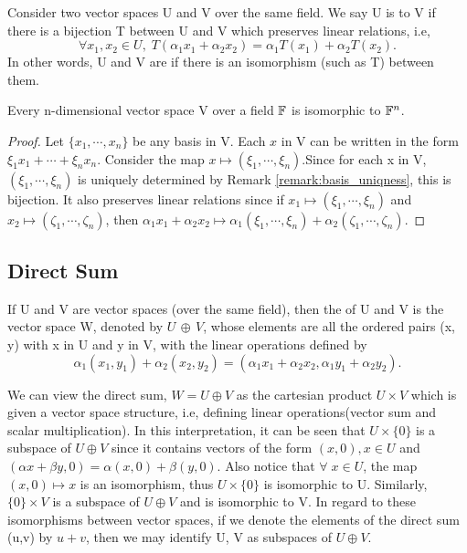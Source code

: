\documentclass[10pt,a4paper]{article}
\begin{document}
\begin{mydef}\label{def:isomorphism}
    Consider two vector spaces U and V over the same field. We say U is  to V if there is a bijection T between U and V which preserves linear relations, i.e, 
    $$\forall x_1,x_2\in U,\;T(\alpha_1 x_1+\alpha_2 x_2) = \alpha_1 T(x_1)+\alpha_2 T(x_2).
    $$
    In other words, U and V are  if there is an isomorphism (such as T) between them.
\end{mydef}

\begin{theorem}\label{thm:F^n_isomorphism}
    Every n-dimensional vector space V over a field $\mathbb{F}$ is isomorphic to $\mathbb{F}^n$.
\end{theorem}

\begin{proof}
    Let $\{x_1,\cdots, x_n\}$ be any basis in V. Each $x$ in V can be written in the form $\xi_1x_1 + \cdots + \xi_nx_n$. Consider the map $x \mapsto (\xi_1,\cdots,\xi_n)$.Since for each x in V, $(\xi_1,\cdots,\xi_n)$ is uniquely determined by Remark \ref{remark:basis_uniqness}, this is bijection. It also preserves linear relations since if $x_1\mapsto (\xi_1,\cdots,\xi_n)$ and $x_2\mapsto (\zeta_1,\cdots,\zeta_n)$, then
    $
        \alpha_1 x_1+\alpha_2 x_2 \mapsto \alpha_1(\xi_1,\cdots,\xi_n)+\alpha_2(\zeta_1,\cdots,\zeta_n).
    $
\end{proof}


\subsection{Direct Sum}\label{sec:direct_sum}

\begin{mydef}\label{def:direct_sum}
    If U and V are vector spaces (over the same field), then the  of U and V is the vector space W, denoted by $U\,\oplus\, V$, whose elements are all the ordered pairs (x, y) with x in U and y in V, with the linear operations defined by
    $$
    \alpha_1(x_1, y_1) + \alpha_2(x_2, y_2) = (\alpha_1x_1+\alpha_2x_2,\alpha_1y_1+\alpha_2y_2).
    $$
\end{mydef}

\begin{note}\label{note:direct_sum}
    We can view the direct sum, $W = U\oplus V$ as the cartesian product $U\times V$ which is given a vector space structure, i.e, defining linear operations(vector sum and scalar multiplication). In this interpretation, it can be seen that $U\times\{0\}$ is a subspace of $U\oplus V$ since it contains vectors of the form $(x,0),x\in U$ and $(\alpha x+\beta y,0) = \alpha(x,0)+\beta(y,0).$ Also notice that $\forall\;x\in U$, the map $(x,0)\mapsto x$ is an isomorphism, thus $U\times\{0\}$ is isomorphic to U. Similarly, $\{0\}\times V$ is a subspace of $U\oplus V$ and is isomorphic to V. In regard to these isomorphisms between vector spaces, if we denote the elements of the direct sum (u,v) by $u+v$, then we may identify U, V as subspaces of $U\oplus V$.
\end{note}
\end{document}
